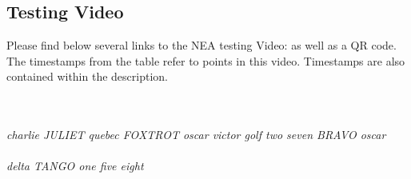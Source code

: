 \begin{flushleft}
    \subsection{Testing Video}
        Please find below several links to the NEA testing Video: as well as a QR code. The timestamps from the table refer to points in this video. Timestamps are also contained within the description. \\ \bk
        
        \begin{center}
            \quad
            \\ \BK
            \large
             \\            
            \normalsizeer
            \textit{charlie JULIET quebec FOXTROT oscar victor golf two seven BRAVO oscar} \\ \bk  
            \large
             \\
            \normalsizeer
            \textit{delta TANGO one five eight}
        \end{center}        
\end{flushleft}